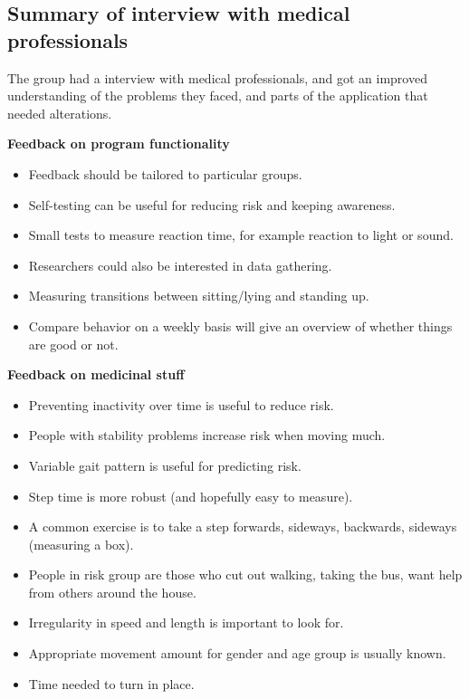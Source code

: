 \subsection{Summary of interview with medical professionals}
The group had a interview with medical professionals, and got an improved understanding of the problems they faced, and parts of the application that needed alterations.

\textbf{Feedback on program functionality}
\begin{itemize}
\item Feedback should be tailored to particular groups.
\item Self-testing can be useful for reducing risk and keeping awareness.
\item Small tests to measure reaction time, for example reaction to light or sound.
\item Researchers could also be interested in data gathering.
\item Measuring transitions between sitting/lying and standing up.
\item Compare behavior on a weekly basis will give an overview of whether things are good or not.
\end{itemize}

\textbf{Feedback on medicinal stuff}
\begin{itemize}
\item Preventing inactivity over time is useful to reduce risk.
\item People with stability problems increase risk when moving much.
\item Variable gait pattern is useful for predicting risk.
\item Step time is more robust (and hopefully easy to measure).
\item A common exercise is to take a step forwards, sideways, backwards, sideways (measuring a box).
\item People in risk group are those who cut out walking, taking the bus, want help from others around the house.
\item Irregularity in speed and length is important to look for.
\item Appropriate movement amount for gender and age group is usually known.
\item Time needed to turn in place.
\end{itemize}

